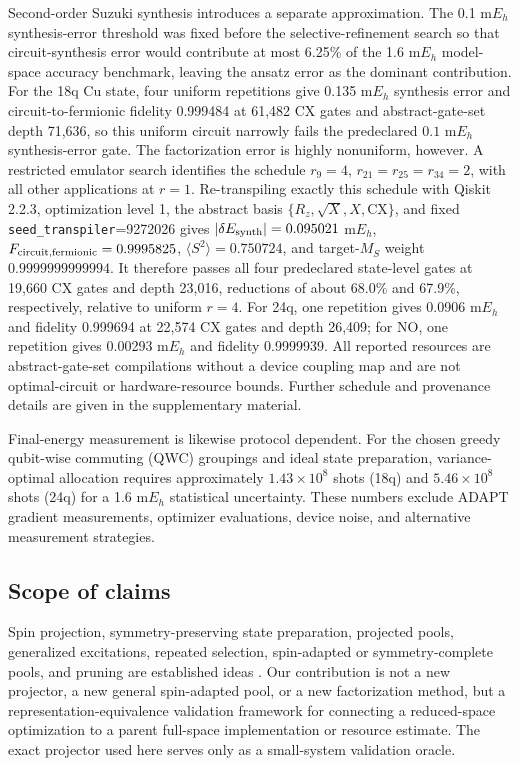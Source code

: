 \documentclass[
 aip,
 jcp,
 amsmath,amssymb,
 preprint
]{revtex4-2}
\begin{document}
Second-order Suzuki synthesis introduces a separate approximation.
The 0.1 m$E_h$ synthesis-error threshold was fixed before the selective-refinement search so that circuit-synthesis error would contribute at most 6.25\% of the 1.6 m$E_h$ model-space accuracy benchmark, leaving the ansatz error as the dominant contribution.
For the 18q Cu state, four uniform repetitions give 0.135 m$E_h$ synthesis error and circuit-to-fermionic fidelity 0.999484 at 61,482 CX gates and abstract-gate-set depth 71,636, so this uniform circuit narrowly fails the predeclared $0.1$ m$E_h$ synthesis-error gate.
The factorization error is highly nonuniform, however.
A restricted emulator search identifies the schedule $r_9=4$, $r_{21}=r_{25}=r_{34}=2$, with all other applications at $r=1$.
Re-transpiling exactly this schedule with Qiskit 2.2.3, optimization level 1, the abstract basis $\{R_z,\sqrt X,X,\mathrm{CX}\}$, and fixed \texttt{seed\_transpiler}=9272026 gives
$|\delta E_{\rm synth}|=0.095021$ m$E_h$,
$F_{\rm circuit,fermionic}=0.9995825$,
$\langle S^2\rangle=0.750724$,
and target-$M_S$ weight $0.9999999999994$.
It therefore passes all four predeclared state-level gates at 19,660 CX gates and depth 23,016, reductions of about 68.0\% and 67.9\%, respectively, relative to uniform $r=4$.
For 24q, one repetition gives 0.0906 m$E_h$ and fidelity 0.999694 at 22,574 CX gates and depth 26,409; for NO, one repetition gives 0.00293 m$E_h$ and fidelity 0.9999939.
All reported resources are abstract-gate-set compilations without a device coupling map and are not optimal-circuit or hardware-resource bounds.
Further schedule and provenance details are given in the supplementary material.

Final-energy measurement is likewise protocol dependent.
For the chosen greedy qubit-wise commuting (QWC) groupings and ideal state preparation, variance-optimal allocation requires approximately $1.43\times10^8$ shots (18q) and $5.46\times10^8$ shots (24q) for a 1.6 m$E_h$ statistical uncertainty.
These numbers exclude ADAPT gradient measurements, optimizer evaluations, device noise, and alternative measurement strategies.

\subsection{Scope of claims}

Spin projection, symmetry-preserving state preparation, projected pools, generalized excitations, repeated selection, spin-adapted or symmetry-complete pools, and pruning are established ideas \cite{gard2020symmetry,seki2020symmetry,tsuchimochi2022spinproj,seki2022projection,weaving2023stabilizer,shkolnikov2023roadblocks,burton2023disco,magoulas2026symmetry}.
Our contribution is not a new projector, a new general spin-adapted pool, or a new factorization method, but a representation-equivalence validation framework for connecting a reduced-space optimization to a parent full-space implementation or resource estimate.
The exact projector used here serves only as a small-system validation oracle.
\end{document}
